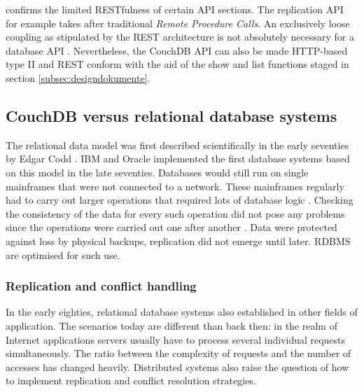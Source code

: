  confirms the limited RESTfulness of certain API sections. The replication API for example takes after traditional \textit{Remote Procedure Calls}. An exclusively loose coupling as stipulated by the REST architecture is not absolutely necessary for a database API \cite{rest:couchapi}. Nevertheless, the CouchDB API can also be made HTTP-based type II and REST conform with the aid of the show and list functions staged in section \ref{subsec:designdokumente}.



\subsection{CouchDB versus relational database systems}

The relational data model was first described scientifically in the early seventies by Edgar Codd . IBM and Oracle implemented the first database systems based on this model in the late seventies. Databases would still run on single mainframes that were not connected to a network. These mainframes regularly had to carry out larger operations that required lots of database logic . Checking the consistency of the data for every such operation did not pose any problems since the operations were carried out one after another . Data were protected against loss by physical backups, replication did not emerge until later. RDBMS are optimised for such use.

\subsubsection{Replication and conflict handling}

In the early eighties, relational database systems also established in other fields of application. The scenarios today are different than back then: in the realm of Internet applications servers usually have to process several individual requests simultaneously. The ratio between the complexity of requests and the number of accesses has changed heavily. Distributed systems also raise the question of how to implement replication and conflict resolution strategies.


